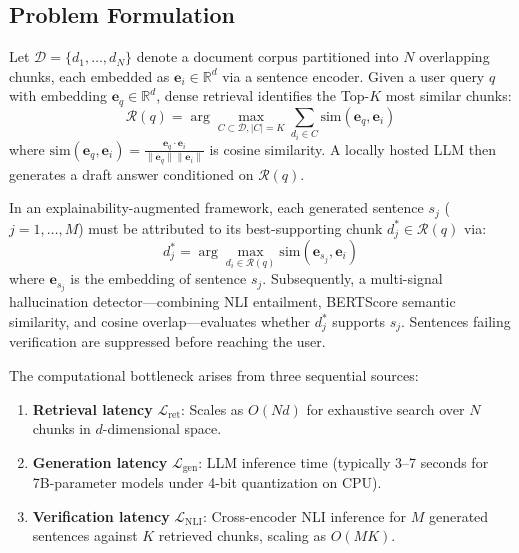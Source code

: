 \documentclass[conference]{IEEEtran}
\begin{document}
\subsection{Problem Formulation}

Let $\mathcal{D} = \{d_1, \ldots, d_N\}$ denote a document corpus partitioned into $N$ overlapping chunks, each embedded as $\mathbf{e}_i \in \mathbb{R}^d$ via a sentence encoder. Given a user query $q$ with embedding $\mathbf{e}_q \in \mathbb{R}^d$, dense retrieval identifies the Top-$K$ most similar chunks:
\begin{equation}
\mathcal{R}(q) = \arg\max_{C \subset \mathcal{D}, |C|=K} \sum_{d_i \in C} \mathrm{sim}(\mathbf{e}_q, \mathbf{e}_i)
\label{eq:retrieval}
\end{equation}
where $\mathrm{sim}(\mathbf{e}_q, \mathbf{e}_i) = \frac{\mathbf{e}_q \cdot \mathbf{e}_i}{\|\mathbf{e}_q\| \|\mathbf{e}_i\|}$ is cosine similarity. A locally hosted LLM then generates a draft answer conditioned on $\mathcal{R}(q)$.

In an explainability-augmented framework, each generated sentence $s_j$ ($j=1,\ldots,M$) must be attributed to its best-supporting chunk $d^*_j \in \mathcal{R}(q)$ via:
\begin{equation}
d^*_j = \arg\max_{d_i \in \mathcal{R}(q)} \mathrm{sim}(\mathbf{e}_{s_j}, \mathbf{e}_i)
\label{eq:attribution}
\end{equation}
where $\mathbf{e}_{s_j}$ is the embedding of sentence $s_j$. Subsequently, a multi-signal hallucination detector—combining NLI entailment, BERTScore semantic similarity, and cosine overlap—evaluates whether $d^*_j$ supports $s_j$. Sentences failing verification are suppressed before reaching the user.

The computational bottleneck arises from three sequential sources:
\begin{enumerate}
    \item \textbf{Retrieval latency} $\mathcal{L}_{\mathrm{ret}}$: Scales as $O(Nd)$ for exhaustive search over $N$ chunks in $d$-dimensional space.
    \item \textbf{Generation latency} $\mathcal{L}_{\mathrm{gen}}$: LLM inference time (typically 3--7 seconds for 7B-parameter models under 4-bit quantization on CPU).
    \item \textbf{Verification latency} $\mathcal{L}_{\mathrm{NLI}}$: Cross-encoder NLI inference for $M$ generated sentences against $K$ retrieved chunks, scaling as $O(MK)$.
\end{enumerate}
\end{document}

